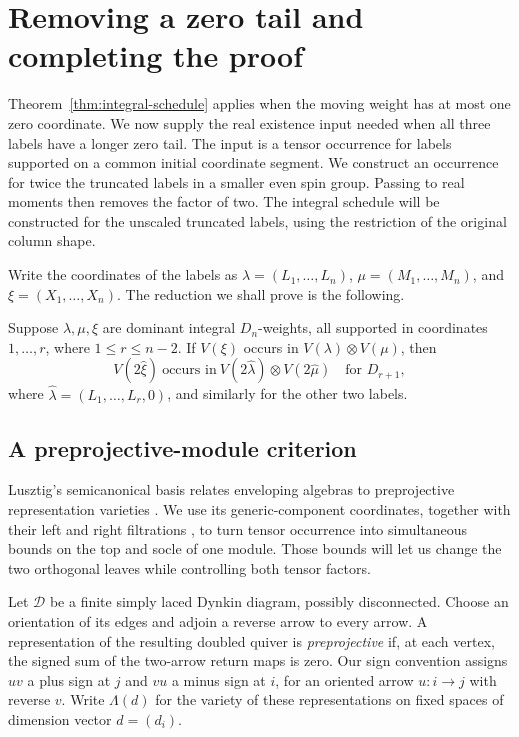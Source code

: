 \section{Removing a zero tail and completing the proof}
\label{sec:zero-tail-completion}

Theorem~\ref{thm:integral-schedule} applies when the moving weight has
at most one zero coordinate.  We now supply the real existence input
needed when all three labels have a longer zero tail. The input is a
tensor occurrence for labels supported on a common initial coordinate
segment. We construct an occurrence for twice the truncated labels in
a smaller even spin group. Passing to real moments then removes the
factor of two. The integral schedule will be constructed for the
unscaled truncated labels, using the restriction of the original
column shape.

Write the coordinates of the labels as
\(\lambda=(L_1,\ldots,L_n)\), \(\mu=(M_1,\ldots,M_n)\), and
\(\xi=(X_1,\ldots,X_n)\). The reduction we shall prove is the
following.

\begin{proposition}\label{prop:zero-tail}
Suppose \(\lambda,\mu,\xi\) are dominant integral \(D_n\)-weights,
all supported in coordinates \(1,\ldots,r\), where
\(1\le r\le n-2\).  If \(V(\xi)\) occurs in
\(V(\lambda)\otimes V(\mu)\), then
\[
 V(2\widehat\xi)\ \text{occurs in}\
 V(2\widehat\lambda)\otimes V(2\widehat\mu)
 \quad\text{for }D_{r+1},
\]
where
\(\widehat\lambda=(L_1,\ldots,L_r,0)\), and similarly for the
other two labels.
\end{proposition}

\subsection{A preprojective-module criterion}

Lusztig's semicanonical basis relates enveloping algebras to
preprojective representation varieties \cite{Lusztig00}. We use its
generic-component coordinates, together with their left and right
filtrations \cite{GLS05,FLX}, to turn tensor occurrence into
simultaneous bounds on the top and socle of one module. Those bounds
will let us change the two orthogonal leaves while controlling both
tensor factors.

Let \(\mathcal D\) be a finite simply laced Dynkin diagram, possibly
disconnected.  Choose an orientation of its edges and adjoin a reverse
arrow to every arrow.  A representation of the resulting doubled
quiver is \emph{preprojective} if, at each vertex, the signed sum of
the two-arrow return maps is zero.  Our sign convention assigns
\(uv\) a plus sign at \(j\) and \(vu\) a minus sign at \(i\), for an
oriented arrow \(u:i\longrightarrow j\) with reverse \(v\).
Write \(\Lambda(d)\) for the variety of these representations on fixed
spaces of dimension vector \(d=(d_i)\).

